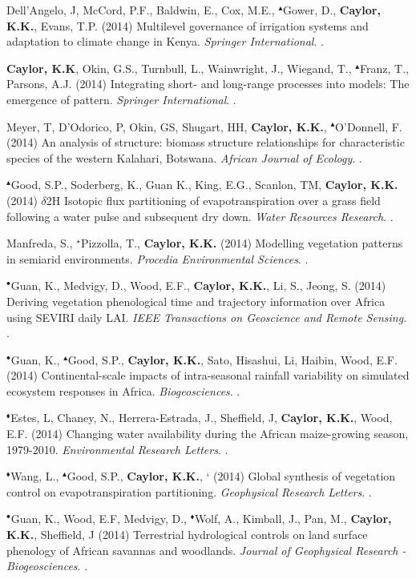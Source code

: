 \begin{etaremune}
\item Dell'Angelo, J, McCord, P.F., Baldwin, E., Cox, M.E., $^{\blacktriangle}$Gower, D., \textbf{ Caylor, K.K.}, Evans, T.P. (2014) Multilevel governance of irrigation systems and adaptation to climate change in Kenya. \emph{Springer International}. .
\item \textbf{ Caylor, K.K}, Okin, G.S., Turnbull, L., Wainwright, J., Wiegand, T., $^{\blacktriangle}$Franz, T., Parsons, A.J. (2014) Integrating short- and long-range processes into models: The emergence of pattern. \emph{Springer International}. .
\item Meyer, T, D'Odorico, P, Okin, GS, Shugart, HH, \textbf{ Caylor, K.K.}, $^{\blacktriangle}$O'Donnell, F. (2014) An analysis of structure: biomass structure relationships for characteristic species of the western Kalahari, Botswana. \emph{African Journal of Ecology}. .
\item $^{\blacktriangle}$Good, S.P., Soderberg, K., Guan K., King, E.G., Scanlon, TM, \textbf{ Caylor, K.K.} (2014) $\delta$2H Isotopic flux partitioning of evapotranspiration over a grass field following a water pulse and subsequent dry down. \emph{Water Resources Research}. .
\item Manfreda, S., $^{\star}$Pizzolla, T., \textbf{ Caylor, K.K.} (2014) Modelling vegetation patterns in semiarid environments. \emph{Procedia Environmental Sciences}. .
\item $^{\bullet}$Guan, K., Medvigy, D., Wood, E.F., \textbf{ Caylor, K.K.}, Li, S., Jeong, S. (2014) Deriving vegetation phenological time and trajectory information over Africa using SEVIRI daily LAI. \emph{IEEE Transactions on Geoscience and Remote Sensing}. .
\item $^{\bullet}$Guan, K., $^{\blacktriangle}$Good, S.P., \textbf{ Caylor, K.K.}, Sato, Hisashui, Li, Haibin, Wood, E.F. (2014) Continental-scale impacts of intra-seasonal rainfall variability on simulated ecosystem responses in Africa. \emph{Biogeosciences}. .
\item $^{\blacklozenge}$Estes, L, Chaney, N., Herrera-Estrada, J., Sheffield, J, \textbf{ Caylor, K.K.}, Wood, E.F. (2014) Changing water availability during the African maize-growing season, 1979-2010. \emph{Environmental Research Letters}. .
\item $^{\blacklozenge}$Wang, L., $^{\blacktriangle}$Good, S.P., \textbf{ Caylor, K.K.}, ` (2014) Global synthesis of vegetation control on evapotranspiration partitioning. \emph{Geophysical Research Letters}. .
\item $^{\bullet}$Guan, K., Wood, E.F, Medvigy, D., $^{\blacklozenge}$Wolf, A., Kimball, J., Pan, M., \textbf{ Caylor, K.K.}, Sheffield, J (2014) Terrestrial hydrological controls on land surface phenology of African savannas and woodlands. \emph{Journal of Geophysical Research - Biogeosciences}. .


\end{etaremune}

